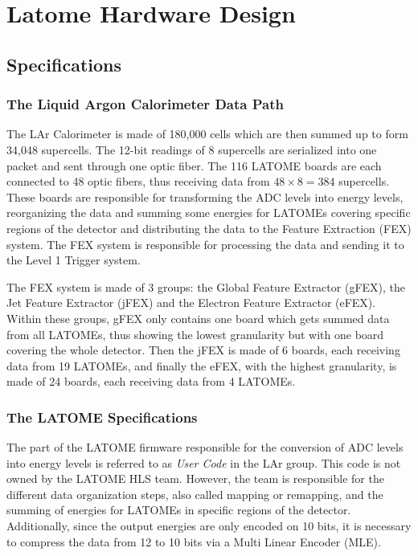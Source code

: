 \chapter{Latome Hardware Design}\label{sec:latome-firmware}

\section{Specifications}\label{sec:specifications}
\subsection{The Liquid Argon Calorimeter Data Path}\label{sec:lar}
The LAr Calorimeter is made of 180,000 cells which are then summed up to form 34,048 supercells. The 12-bit readings of 8 supercells are serialized into one packet and sent through one optic fiber. The 116 LATOME boards are each connected to 48 optic fibers, thus receiving data from \(48\times8=384\) supercells. These boards are responsible for transforming the ADC levels into energy levels, reorganizing the data and summing some energies for LATOMEs covering specific regions of the detector and distributing the data to the Feature Extraction (FEX) system. The FEX system is responsible for processing the data and sending it to the Level 1 Trigger system.

The FEX system is made of 3 groups: the Global Feature Extractor (gFEX), the Jet Feature Extractor (jFEX) and the Electron Feature Extractor (eFEX). Within these groups, gFEX only contains one board which gets summed data from all LATOMEs, thus showing the lowest granularity but with one board covering the whole detector. Then the jFEX is made of 6 boards, each receiving data from 19 LATOMEs, and finally the eFEX, with the highest granularity, is made of 24 boards, each receiving data from 4 LATOMEs.

\subsection{The LATOME Specifications}\label{sec:latome-specifications}
The part of the LATOME firmware responsible for the conversion of ADC levels into energy levels is referred to as \textit{User Code} in the LAr group. This code is not owned by the LATOME HLS team. However, the team is responsible for the different data organization steps, also called mapping or remapping, and the summing of energies for LATOMEs in specific regions of the detector. Additionally, since the output energies are only encoded on 10 bits, it is necessary to compress the data from 12 to 10 bits via a Multi Linear Encoder (MLE).

